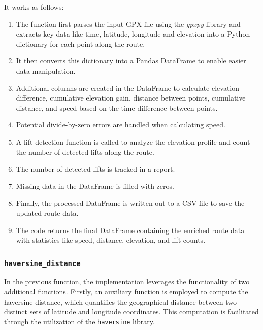 It works as follows:
\begin{enumerate}
    \item The function first parses the input GPX file using the \textit{gpxpy} library and extracts key data like time, latitude, longitude and elevation into a Python dictionary for each point along the route.
    
    \item It then converts this dictionary into a Pandas DataFrame to enable easier data manipulation.
    
    \item Additional columns are created in the DataFrame to calculate elevation difference, cumulative elevation gain, distance between points, cumulative distance, and speed based on the time difference between points.
    
    \item Potential divide-by-zero errors are handled when calculating speed.
    
    \item A lift detection function is called to analyze the elevation profile and count the number of detected lifts along the route.
    
    \item The number of detected lifts is tracked in a report.
    
    \item Missing data in the DataFrame is filled with zeros.
    
    \item Finally, the processed DataFrame is written out to a CSV file to save the updated route data.
    
    \item The code returns the final DataFrame containing the enriched route data with statistics like speed, distance, elevation, and lift counts.
\end{enumerate}


\subsubsection{\texttt{haversine\_distance}}

In the previous function, the implementation leverages the functionality of two additional functions. Firstly, an auxiliary function is employed to compute the haversine distance, which quantifies the geographical distance between two distinct sets of latitude and longitude coordinates. This computation is facilitated through the utilization of the \texttt{haversine} library. 

